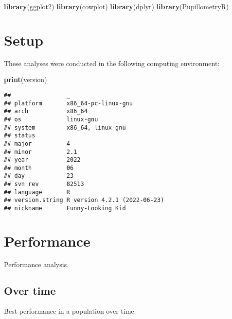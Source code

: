 \documentclass[]{book}
\newenvironment{Shaded}{\begin{snugshade}}{\end{snugshade}}
\newcommand{\KeywordTok}[1]{\textcolor[rgb]{0.13,0.29,0.53}{\textbf{#1}}}
\newcommand{\NormalTok}[1]{#1}
\begin{document}
\begin{Shaded}
\begin{Highlighting}[]
\KeywordTok{library}\NormalTok{(ggplot2)}
\KeywordTok{library}\NormalTok{(cowplot)}
\KeywordTok{library}\NormalTok{(dplyr)}
\KeywordTok{library}\NormalTok{(PupillometryR)}
\end{Highlighting}
\end{Shaded}

\hypertarget{setup-3}{%
\section{Setup}\label{setup-3}}

These analyses were conducted in the following computing environment:

\begin{Shaded}
\begin{Highlighting}[]
\KeywordTok{print}\NormalTok{(version)}
\end{Highlighting}
\end{Shaded}

\begin{verbatim}
##                _                           
## platform       x86_64-pc-linux-gnu         
## arch           x86_64                      
## os             linux-gnu                   
## system         x86_64, linux-gnu           
## status                                     
## major          4                           
## minor          2.1                         
## year           2022                        
## month          06                          
## day            23                          
## svn rev        82513                       
## language       R                           
## version.string R version 4.2.1 (2022-06-23)
## nickname       Funny-Looking Kid
\end{verbatim}

\hypertarget{performance}{%
\section{Performance}\label{performance}}

Performance analysis.

\hypertarget{over-time-1}{%
\subsection{Over time}\label{over-time-1}}

Best performance in a population over time.
\end{document}

